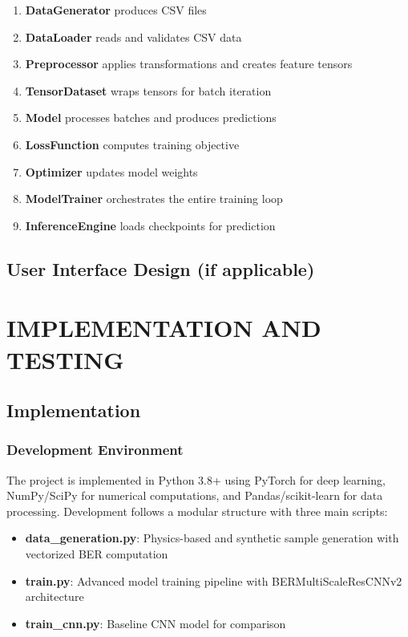 \documentclass[a4paper,12pt]{report}
\begin{document}
\begin{enumerate}
    \item \textbf{DataGenerator} produces CSV files
    \item \textbf{DataLoader} reads and validates CSV data
    \item \textbf{Preprocessor} applies transformations and creates feature tensors
    \item \textbf{TensorDataset} wraps tensors for batch iteration
    \item \textbf{Model} processes batches and produces predictions
    \item \textbf{LossFunction} computes training objective
    \item \textbf{Optimizer} updates model weights
    \item \textbf{ModelTrainer} orchestrates the entire training loop
    \item \textbf{InferenceEngine} loads checkpoints for prediction
\end{enumerate}

\section{User Interface Design (if applicable)}

\chapter{IMPLEMENTATION AND TESTING}

\section{Implementation}

\subsection{Development Environment}

The project is implemented in Python 3.8+ using PyTorch for deep learning, NumPy/SciPy for numerical computations, and Pandas/scikit-learn for data processing. Development follows a modular structure with three main scripts:

\begin{itemize}
    \item \textbf{data\_generation.py}: Physics-based and synthetic sample generation with vectorized BER computation
    \item \textbf{train.py}: Advanced model training pipeline with BERMultiScaleResCNNv2 architecture
    \item \textbf{train\_cnn.py}: Baseline CNN model for comparison
\end{itemize}
\end{document}
